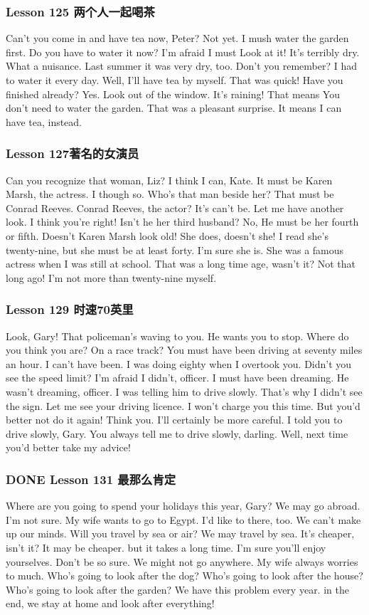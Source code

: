 \documentclass[11pt]{ctexart}
\begin{document}
\subsubsection{Lesson 125 两个人一起喝茶}
\label{sec:org66f243e}
Can't you come in and have tea now, Peter?
Not yet.
I mush water the garden first.
Do you have to water it now?
I'm afraid I must
Look at it!
It's terribly dry.
What a nuisance.
Last summer it was very dry, too.
Don't you remember?
I had to water it every day.
Well, I'll have tea by myself.
That was quick!
Have you finished already?
Yes. Look out of the window.
It's raining!
That means You don't need to water the garden.
That was a pleasant surprise.
It means I can have tea, instead.

\subsubsection{Lesson 127著名的女演员}
\label{sec:org15bb5ec}
Can you recognize that woman, Liz?
I think I can, Kate.
It must be Karen Marsh, the actress.
I though so.
Who's that man beside her?
That must be Conrad Reeves.
Conrad Reeves, the actor?
It's can't be.
Let me have another look.
I think you're right!
Isn't he her third husband?
No, He must be her fourth or fifth.
Doesn't Karen Marsh look old!
She does, doesn't she!
I read she's twenty-nine,
but she must be at least forty.
I'm sure she is.
She was a famous actress when I was still at school.
That was a long time age, wasn't it?
Not that long ago!
I'm not more than twenty-nine myself.
\subsubsection{Lesson 129 时速70英里}
\label{sec:orgca0dbbf}
Look, Gary!
That policeman's waving to you.
He wants you to stop.
Where do you think you are?
On a race track?
You must have been driving at seventy miles an hour.
I can't have been.
I was doing eighty when I overtook you.
Didn't you see the speed limit?
I'm afraid I didn't, officer.
I must have been dreaming.
He wasn't dreaming, officer.
I was telling him to drive slowly.
That's why I didn't see the sign.
Let me see your driving licence.
I won't charge you this time.
But you'd better not do it again!
Think you. I'll certainly be more careful.
I told you to drive slowly, Gary.
You always tell me to drive slowly, darling.
Well, next time you'd better take my advice!
\subsubsection{{\bfseries\sffamily DONE} Lesson 131 最那么肯定}
\label{sec:org6e85e3e}
Where are you going to spend your holidays this year, Gary?
We may go abroad.
I'm not sure.
My wife wants to go to Egypt.
I'd like to there, too.
We can't make up our minds.
Will you travel by sea or air?
We may travel by sea.
It's cheaper, isn't it?
It may be cheaper.
but it takes a long time.
I'm sure you'll enjoy yourselves.
Don't be so sure.
We might not go anywhere.
My wife always worries to much.
Who's going to look after the dog?
Who's going to look after the house?
Who's going to look after the garden?
We have this problem every year.
in the end, we stay at home and look after everything!
\end{document}
